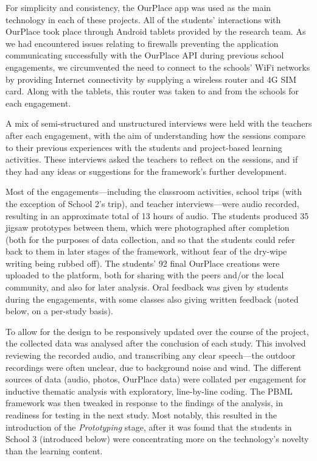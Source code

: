 For simplicity and consistency, the OurPlace app was used as the main technology in each of these projects. All of the students' interactions with OurPlace took place through Android tablets provided by the research team. As we had encountered issues relating to firewalls preventing the application communicating successfully with the OurPlace API during previous school engagements, we circumvented the need to connect to the schools' WiFi networks by providing Internet connectivity by supplying a wireless router and 4G SIM card. Along with the tablets, this router was taken to and from the schools for each engagement.

A mix of semi-structured and unstructured interviews were held with the teachers after each engagement, with the aim of understanding how the sessions compare to their previous experiences with the students and project-based learning activities. These interviews asked the teachers to reflect on the sessions, and if they had any ideas or suggestions for the framework's further development.

Most of the engagements---including the classroom activities, school trips (with the exception of School 2's trip), and teacher interviews---were audio recorded, resulting in an approximate total of 13 hours of audio. The students produced 35 jigsaw prototypes between them, which were photographed after completion (both for the purposes of data collection, and so that the students could refer back to them in later stages of the framework, without fear of the dry-wipe writing being rubbed off). The students' 92 final OurPlace creations were uploaded to the platform, both for sharing with the peers and/or the local community, and also for later analysis. Oral feedback was given by students during the engagements, with some classes also giving written feedback (noted below, on a per-study basis).

To allow for the design to be responsively updated over the course of the project, the collected data was analysed after the conclusion of each study. This involved reviewing the recorded audio, and transcribing any clear speech---the outdoor recordings were often unclear, due to background noise and wind. The different sources of data (audio, photos, OurPlace data) were collated per engagement for inductive thematic analysis with exploratory, line-by-line coding. The PBML framework was then tweaked in response to the findings of the analysis, in readiness for testing in the next study. Most notably, this resulted in the introduction of the \textit{Prototyping} stage, after it was found that the students in School 3 (introduced below) were concentrating more on the technology's novelty than the learning content.

